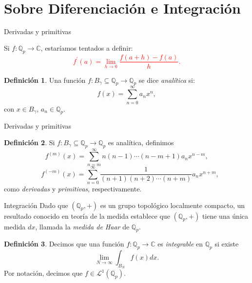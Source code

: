 \documentclass{beamer}
\theoremstyle{definition}
\numberwithin{equation}{section}
\newcommand{\marine}[1]{\textcolor{defColor}{#1}}
\newtheorem{df}{\marine{Definición}}
\newcommand{\tit}[1]{\textit{#1}}
\newcommand{\red}[1]{\textcolor{red}{#1}}
\newcommand{\C}{\mathbb{C}}
\newcommand{\Qp}{\mathbb{Q}_p}
\begin{document}
\section{Sobre Diferenciación e Integración}

\begin{frame}{Derivadas y primitivas}
	
		Si $f\colon\Qp\to\C$, estaríamos tentados a definir: \red{$$f^{\prime} (a)=\lim\limits_{h\to 0}\frac{f (a+h)-f (a)}{h}.$$}
	\begin{df}
		Una función $f\colon B_\gamma\subseteq\Qp\to\Qp$ se dice \tit{analítica} si:
		$$f (x)=\sum_{n=0}^{\infty}a_nx^n,$$
		con $x\in B_\gamma$, $a_n\in\Qp$. 
	\end{df}
	
\end{frame}
\begin{frame}{Derivadas y primitivas}
	\begin{df} Si $f\colon B_\gamma\subseteq\Qp\to\Qp$ es analítica, definimos
		\[
		f^{ (m)} (x)=\sum_{n=m}^{\infty} n (n-1) \cdots (n-m+1) a_{n} x^{n-m},
		\]
		\[
		\quad f^{ (-m)} (x)=\sum_{n=0}^{\infty} \frac{1}{ (n+1) (n+2) \cdots (n+m)} a_{n} x^{n+m},
		\] 
		como \textit{derivadas} y \textit{primitivas}, respectivamente.
	\end{df}
\end{frame}

\begin{frame}{Integración}
	Dado que $ (\Qp, +)$ es un grupo topológico localmente compacto, un resultado conocido en teoría de la medida establece que $ (\Qp, +)$ tiene
	una única medida $dx$, llamada la \textit{medida de Haar}	de $\Qp$.
	\begin{df}
		Decimos que una función $f\colon\Qp\to\C$  es \textit{integrable} en $\Qp$ si existe 
		$$\lim _{N \rightarrow \infty} \int_{B_{N}} f (x) dx.$$
		Por notación, decimos que $f\in\mathcal{L}^1(\Qp)$.
		
		
	\end{df}
\end{frame}
\end{document}
